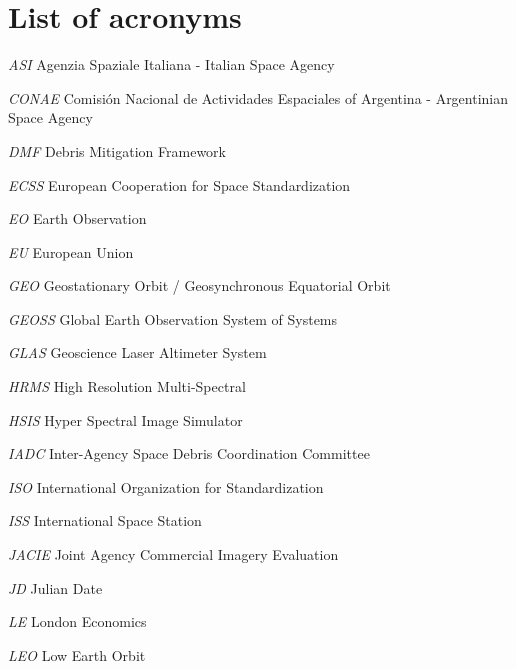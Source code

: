 \documentclass[12pt,a4paper,notitlepage,oneside,openright]{report}
\begin{document}







\newpage



\chapter*{List of acronyms}
\begin{abbrv}
\item[\textit{ASI}] Agenzia Spaziale Italiana - Italian Space Agency
\item[\textit{CONAE}] Comisión Nacional de Actividades Espaciales of Argentina - \newline Argentinian Space Agency
\item[\textit{DMF}] Debris Mitigation Framework
\item[\textit{ECSS}] European Cooperation for Space Standardization
\item[\textit{EO}] Earth Observation
\item[\textit{EU}] European Union
\item[\textit{GEO}] Geostationary Orbit / Geosynchronous Equatorial Orbit
\item[\textit{GEOSS}] Global Earth Observation System of Systems
\item[\textit{GLAS}] Geoscience Laser Altimeter System
\item[\textit{HRMS}] High Resolution Multi-Spectral
\item[\textit{HSIS}] Hyper Spectral Image Simulator
\item[\textit{IADC}] Inter-Agency Space Debris Coordination Committee
\item[\textit{ISO}] International Organization for Standardization
\item[\textit{ISS}] International Space Station
\item[\textit{JACIE}] Joint Agency Commercial Imagery Evaluation
\item[\textit{JD}] Julian Date
\item[\textit{LE}] London Economics
\item[\textit{LEO}] Low Earth Orbit

\end{abbrv}
\end{document}
